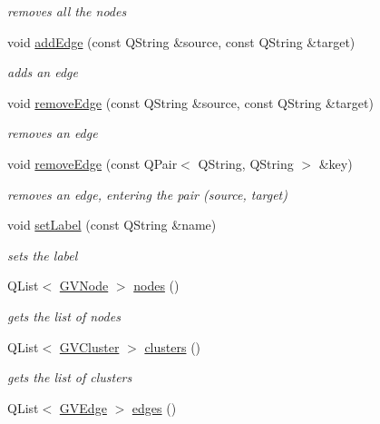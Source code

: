 \begin{DoxyCompactItemize}
\begin{DoxyCompactList}\small\item\em removes all the nodes \end{DoxyCompactList}\item 
void \hyperlink{class_g_v_sub_graph_a84df91480a9e3c7ec38658b475e13d90}{add\-Edge} (const \-Q\-String \&source, const \-Q\-String \&target)
\begin{DoxyCompactList}\small\item\em adds an edge \end{DoxyCompactList}\item 
void \hyperlink{class_g_v_sub_graph_adeec195e6301f14864ad3cf4ecb2a7e6}{remove\-Edge} (const \-Q\-String \&source, const \-Q\-String \&target)
\begin{DoxyCompactList}\small\item\em removes an edge \end{DoxyCompactList}\item 
void \hyperlink{class_g_v_sub_graph_a42c2d7c92a223e40364c13fdb1cc46e8}{remove\-Edge} (const \-Q\-Pair$<$ \-Q\-String, \-Q\-String $>$ \&key)
\begin{DoxyCompactList}\small\item\em removes an edge, entering the pair (source, target) \end{DoxyCompactList}\item 
void \hyperlink{class_g_v_sub_graph_a14a5e0a85c54220e4908e2692576e62b}{set\-Label} (const \-Q\-String \&name)
\begin{DoxyCompactList}\small\item\em sets the label \end{DoxyCompactList}\item 
\-Q\-List$<$ \hyperlink{struct_g_v_node}{\-G\-V\-Node} $>$ \hyperlink{class_g_v_sub_graph_a777c2146e514db2ccded4b3f77993155}{nodes} ()
\begin{DoxyCompactList}\small\item\em gets the list of nodes \end{DoxyCompactList}\item 
\-Q\-List$<$ \hyperlink{struct_g_v_cluster}{\-G\-V\-Cluster} $>$ \hyperlink{class_g_v_sub_graph_a52594db2f31cfb221820cbd48b6d3530}{clusters} ()
\begin{DoxyCompactList}\small\item\em gets the list of clusters \end{DoxyCompactList}\item 
\-Q\-List$<$ \hyperlink{struct_g_v_edge}{\-G\-V\-Edge} $>$ \hyperlink{class_g_v_sub_graph_a88469fa80e33d2506cde3b6352c3c508}{edges} ()

\end{DoxyCompactItemize}

